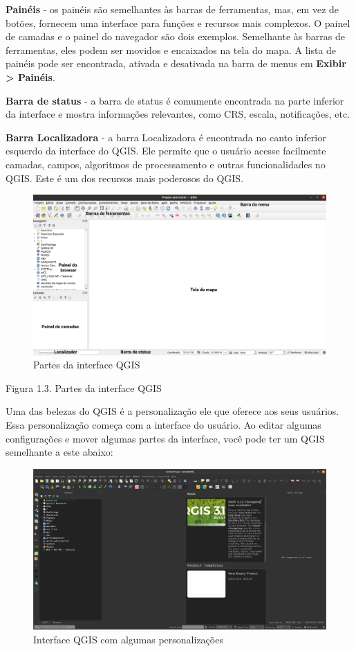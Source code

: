 \documentclass[
  portuguese,
]{krantz}
\begin{document}
\textbf{Painéis} - os painéis são semelhantes às barras de ferramentas, mas, em vez de botões, fornecem uma interface para funções e recursos mais complexos. O painel de camadas e o painel do navegador são dois exemplos. Semelhante às barras de ferramentas, eles podem ser movidos e encaixados na tela do mapa. A lista de painéis pode ser encontrada, ativada e desativada na barra de menus em \textbf{Exibir \textgreater{} Painéis}.

\textbf{Barra de status} - a barra de status é comumente encontrada na parte inferior da interface e mostra informações relevantes, como CRS, escala, notificações, etc.

\textbf{Barra Localizadora} - a barra Localizadora é encontrada no canto inferior esquerdo da interface do QGIS. Ele permite que o usuário acesse facilmente camadas, campos, algoritmos de processamento e outras funcionalidades no QGIS. Este é um dos recursos mais poderosos do QGIS.

\begin{figure}
\centering
\includegraphics{media/modulo1/qgis-interface-parts.png}
\caption{Partes da interface QGIS}
\end{figure}

Figura 1.3. Partes da interface QGIS

Uma das belezas do QGIS é a personalização ele que oferece aos seus usuários. Essa personalização começa com a interface do usuário. Ao editar algumas configurações e mover algumas partes da interface, você pode ter um QGIS semelhante a este abaixo:

\begin{figure}
\centering
\includegraphics{media/modulo1/qgis-interface-custom.png}
\caption{Interface QGIS com algumas personalizações}
\end{figure}
\end{document}
